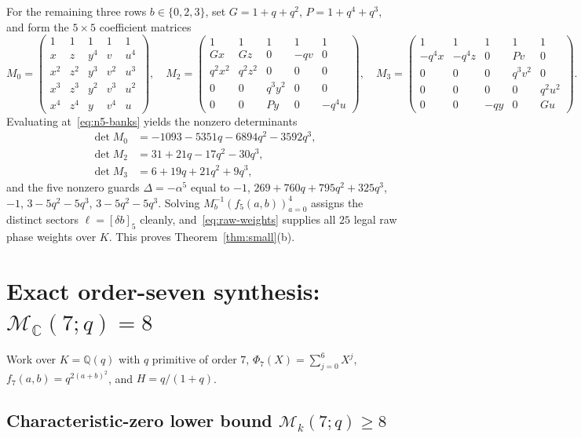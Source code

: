 \documentclass[11pt,reqno]{amsart}
\numberwithin{equation}{section}
\theoremstyle{definition}
\theoremstyle{remark}
\newcommand{\C}{\mathbb{C}}
\newcommand{\Q}{\mathbb{Q}}
\newcommand{\M}{\mathcal{M}}
\begin{document}
For the remaining three rows $b\in\{0,2,3\}$, set $G=1+q+q^2$, $P=1+q^4+q^3$, and form the $5\times 5$ coefficient matrices
\[
M_0 = \begin{pmatrix}
1&1&1&1&1\\
x&z&y^4&v&u^4\\
x^2&z^2&y^3&v^2&u^3\\
x^3&z^3&y^2&v^3&u^2\\
x^4&z^4&y&v^4&u
\end{pmatrix},\quad
M_2 = \begin{pmatrix}
1&1&1&1&1\\
Gx&Gz&0&-qv&0\\
q^2x^2&q^2z^2&0&0&0\\
0&0&q^3y^2&0&0\\
0&0&Py&0&-q^4u
\end{pmatrix},\quad
M_3 = \begin{pmatrix}
1&1&1&1&1\\
-q^4x&-q^4z&0&Pv&0\\
0&0&0&q^3v^2&0\\
0&0&0&0&q^2u^2\\
0&0&-qy&0&Gu
\end{pmatrix}.
\]
Evaluating at~\eqref{eq:n5-banks} yields the nonzero determinants
\begin{align*}
\det M_0 &= -1093 - 5351q - 6894q^2 - 3592q^3,\\
\det M_2 &= 31 + 21q - 17q^2 - 30q^3,\\
\det M_3 &= 6 + 19q + 21q^2 + 9q^3,
\end{align*}
and the five nonzero guards $\Delta=-\alpha^5$ equal to $-1$, $269+760q+795q^2+325q^3$, $-1$, $3-5q^2-5q^3$, $3-5q^2-5q^3$. Solving $M_b^{-1}(f_5(a,b))_{a=0}^4$ assigns the distinct sectors $\ell=[\delta b]_5$ cleanly, and~\eqref{eq:raw-weights} supplies all $25$ legal raw phase weights over $K$. This proves Theorem~\ref{thm:small}(b).

\section{Exact order-seven synthesis: $\M_{\C}(7;q)=8$}
\label{sec:n7}

Work over $K=\Q(q)$ with $q$ primitive of order $7$, $\Phi_7(X)=\sum_{j=0}^6 X^j$, $f_7(a,b)=q^{2(a+b)^2}$, and $H=q/(1+q)$.

\subsection{Characteristic-zero lower bound $\M_k(7;q)\ge 8$}
\label{sec:n7lower}
\end{document}
